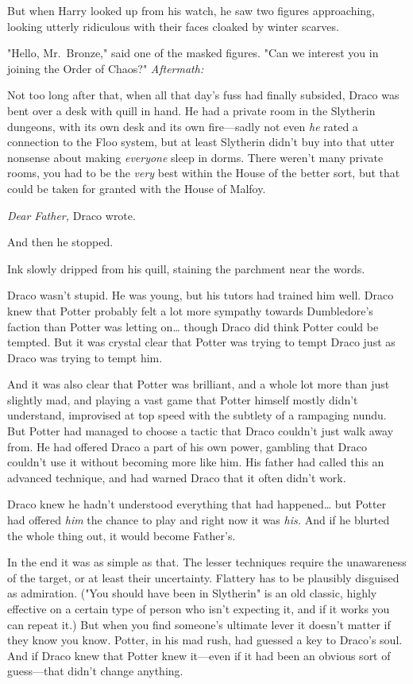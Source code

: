 But when Harry looked up from his watch, he saw two figures approaching, 
looking utterly ridiculous with their faces cloaked by winter scarves.

"Hello, Mr.~Bronze," said one of the masked figures. "Can we interest you in 
joining the Order of Chaos?"
\sbreak
\emph{Aftermath:}

Not too long after that, when all that day's fuss had finally subsided, Draco 
was bent over a desk with quill in hand. He had a private room in the Slytherin 
dungeons, with its own desk and its own fire---sadly not even \emph{he} rated a 
connection to the Floo system, but at least Slytherin didn't buy into that 
utter nonsense about making \emph{everyone} sleep in dorms. There weren't many 
private rooms, you had to be the \emph{very} best within the House of the 
better sort, but that could be taken for granted with the House of Malfoy.

\emph{Dear Father,} Draco wrote.

And then he stopped.

Ink slowly dripped from his quill, staining the parchment near the words.

Draco wasn't stupid. He was young, but his tutors had trained him well. Draco 
knew that Potter probably felt a lot more sympathy towards Dumbledore's faction 
than Potter was letting on{\ldots} though Draco did think Potter could be 
tempted. But it was crystal clear that Potter was trying to tempt Draco just as 
Draco was trying to tempt him.

And it was also clear that Potter was brilliant, and a whole lot more than just 
slightly mad, and playing a vast game that Potter himself mostly didn't 
understand, improvised at top speed with the subtlety of a rampaging nundu. But 
Potter had managed to choose a tactic that Draco couldn't just walk away from. 
He had offered Draco a part of his own power, gambling that Draco couldn't use 
it without becoming more like him. His father had called this an advanced 
technique, and had warned Draco that it often didn't work.

Draco knew he hadn't understood everything that had happened{\ldots} but Potter 
had offered \emph{him} the chance to play and right now it was \emph{his.} And 
if he blurted the whole thing out, it would become Father's.

In the end it was as simple as that. The lesser techniques require the 
unawareness of the target, or at least their uncertainty. Flattery has to be 
plausibly disguised as admiration. ("You should have been in Slytherin" is an 
old classic, highly effective on a certain type of person who isn't expecting 
it, and if it works you can repeat it.) But when you find someone's ultimate 
lever it doesn't matter if they know you know. Potter, in his mad rush, had 
guessed a key to Draco's soul. And if Draco knew that Potter knew it---even if 
it had been an obvious sort of guess---that didn't change anything.

